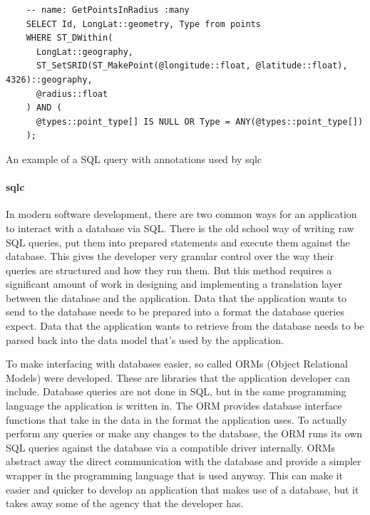 \begin{listing}[htbp]
  \centering{}
  \begin{minipage}{\textwidth}
  \begin{verbatim}
    -- name: GetPointsInRadius :many
    SELECT Id, LongLat::geometry, Type from points
    WHERE ST_DWithin(
      LongLat::geography,
      ST_SetSRID(ST_MakePoint(@longitude::float, @latitude::float), 4326)::geography,
      @radius::float
    ) AND (
      @types::point_type[] IS NULL OR Type = ANY(@types::point_type[])
    );
  \end{verbatim}
  \end{minipage}
  \caption{An example of a SQL query with annotations used by sqlc}
  \label{listing:sqlc_query_input}
\end{listing}

\paragraph{sqlc}
In modern software development, there are two common ways for an application to
interact with a database via SQL. There is the old school way of writing raw SQL
queries, put them into prepared statements and execute them against the
database. This gives the developer very granular control over the way their
queries are structured and how they run them. But this method requires a
significant amount of work in designing and implementing a translation layer
between the database and the application. Data that the application wants to
send to the database needs to be prepared into a format the database queries
expect. Data that the application wants to retrieve from the database needs to
be parsed back into the data model that's used by the application.

To make interfacing with databases easier, so called ORMs (Object Relational
Models) were developed. These are libraries that the application developer can
include. Database queries are not done in SQL, but in the same programming
language the application is written in. The ORM provides database interface
functions that take in the data in the format the application uses. To actually
perform any queries or make any changes to the database, the ORM runs its own
SQL queries against the database via a compatible driver internally. ORMs
abstract away the direct communication with the database and provide a simpler
wrapper in the programming language that is used anyway. This can make it easier
and quicker to develop an application that makes use of a database, but it takes
away some of the agency that the developer has.

